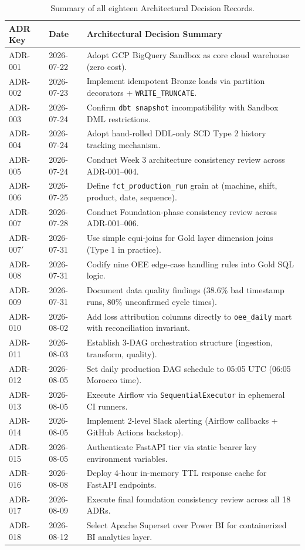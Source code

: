 \documentclass[12pt, a4paper]{report}
\begin{document}
\begin{table}[h]
\centering
\begin{tabularx}{\textwidth}{l l X}
\toprule
\textbf{\color{primary}ADR Key} & \textbf{\color{primary}Date} & \textbf{\color{primary}Architectural Decision Summary} \\
\midrule
ADR-001 & 2026-07-22 & Adopt GCP BigQuery Sandbox as core cloud warehouse (zero cost). \\
ADR-002 & 2026-07-23 & Implement idempotent Bronze loads via partition decorators + \texttt{WRITE\_TRUNCATE}. \\
ADR-003 & 2026-07-24 & Confirm \texttt{dbt snapshot} incompatibility with Sandbox DML restrictions. \\
ADR-004 & 2026-07-24 & Adopt hand-rolled DDL-only SCD Type 2 history tracking mechanism. \\
ADR-005 & 2026-07-24 & Conduct Week 3 architecture consistency review across ADR-001--004. \\
ADR-006 & 2026-07-25 & Define \texttt{fct\_production\_run} grain at (machine, shift, product, date, sequence). \\
ADR-007 & 2026-07-28 & Conduct Foundation-phase consistency review across ADR-001--006. \\
ADR-007$'$\footnotemark & 2026-07-31 & Use simple equi-joins for Gold layer dimension joins (Type 1 in practice). \\
ADR-008 & 2026-07-31 & Codify nine OEE edge-case handling rules into Gold SQL logic. \\
ADR-009 & 2026-07-31 & Document data quality findings (38.6\% bad timestamp runs, 80\% unconfirmed cycle times). \\
ADR-010 & 2026-08-02 & Add loss attribution columns directly to \texttt{oee\_daily} mart with reconciliation invariant. \\
ADR-011 & 2026-08-03 & Establish 3-DAG orchestration structure (ingestion, transform, quality). \\
ADR-012 & 2026-08-05 & Set daily production DAG schedule to 05:05 UTC (06:05 Morocco time). \\
ADR-013 & 2026-08-05 & Execute Airflow via \texttt{SequentialExecutor} in ephemeral CI runners. \\
ADR-014 & 2026-08-05 & Implement 2-level Slack alerting (Airflow callbacks + GitHub Actions backstop). \\
ADR-015 & 2026-08-05 & Authenticate FastAPI tier via static bearer key environment variables. \\
ADR-016 & 2026-08-08 & Deploy 4-hour in-memory TTL response cache for FastAPI endpoints. \\
ADR-017 & 2026-08-09 & Execute final foundation consistency review across all 18 ADRs. \\
ADR-018 & 2026-08-12 & Select Apache Superset over Power BI for containerized BI analytics layer. \\
\bottomrule
\end{tabularx}
\caption{Summary of all eighteen Architectural Decision Records.}
\label{tab:adr-summary}
\end{table}
\end{document}
